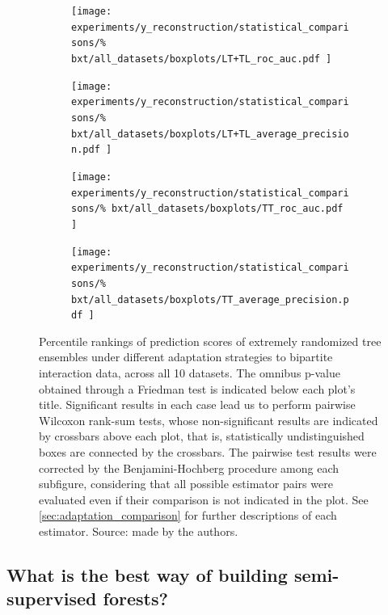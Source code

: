 \begin{figure}[tbh]
    \centering
    \begin{subfigure}{0.49\textwidth}
        \texttt{[image: 
            experiments/y\_reconstruction/statistical\_comparisons/\%
            bxt/all\_datasets/boxplots/LT+TL\_roc\_auc.pdf
        ]}
    \end{subfigure}
    \begin{subfigure}{0.49\textwidth}
        \texttt{[image: 
            experiments/y\_reconstruction/statistical\_comparisons/\%
            bxt/all\_datasets/boxplots/LT+TL\_average\_precision.pdf
        ]}
    \end{subfigure}

    \begin{subfigure}{0.49\textwidth}
        \texttt{[image: 
            experiments/y\_reconstruction/statistical\_comparisons/\%
            bxt/all\_datasets/boxplots/TT\_roc\_auc.pdf
        ]}
    \end{subfigure}
    \begin{subfigure}{0.49\textwidth}
        \texttt{[image: 
            experiments/y\_reconstruction/statistical\_comparisons/\%
            bxt/all\_datasets/boxplots/TT\_average\_precision.pdf
        ]}
    \end{subfigure}
    \caption{
        Percentile rankings of prediction scores of extremely randomized tree ensembles under different adaptation strategies to bipartite interaction data, across all 10 datasets.
        The omnibus p-value obtained through a Friedman test is indicated below each plot's title. Significant results in each case lead us to perform pairwise Wilcoxon rank-sum tests, whose non-significant results are indicated by crossbars above each plot, that is, statistically undistinguished boxes are connected by the crossbars. The pairwise test results were corrected by the Benjamini-Hochberg procedure among each subfigure, considering that all possible estimator pairs were evaluated even if their comparison is not indicated in the plot. See \autoref{sec:adaptation_comparison} for further descriptions of each estimator. Source: made by the authors.
    }
    \label{fig:bxt_y_reconstruction}
\end{figure}



\subsection{What is the best way of building semi-supervised forests?}
\label{sec:ss_comparison}


